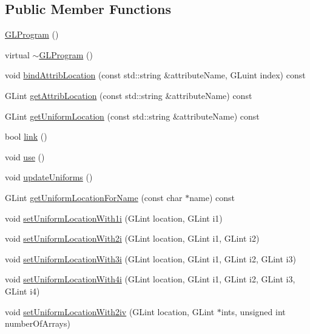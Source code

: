 \subsection*{Public Member Functions}
\begin{DoxyCompactItemize}
\item 
\hyperlink{classGLProgram_ac6a2778c8bf8c49e0d8ceb6d88e1a8fe}{G\+L\+Program} ()
\item 
virtual \hyperlink{classGLProgram_afbda874ed54a3f71625556083eba8603}{$\sim$\+G\+L\+Program} ()
\item 
void \hyperlink{classGLProgram_a06fab65fe4aa591530f2b5e61516756c}{bind\+Attrib\+Location} (const std\+::string \&attribute\+Name, G\+Luint index) const
\item 
G\+Lint \hyperlink{classGLProgram_a2bdaba0068ae955ee8395f6017f7781b}{get\+Attrib\+Location} (const std\+::string \&attribute\+Name) const
\item 
G\+Lint \hyperlink{classGLProgram_a36c4bb72ceff2951794c8b0b52ed9ef1}{get\+Uniform\+Location} (const std\+::string \&attribute\+Name) const
\item 
bool \hyperlink{classGLProgram_a667d81ca9b3ac97fb8959aacdcb96f0b}{link} ()
\item 
void \hyperlink{classGLProgram_a02d4c488d50f8e4235e6476d111b0890}{use} ()
\item 
void \hyperlink{classGLProgram_a4c3fb8cdcfbdcd1e88c9b1b768ad64e9}{update\+Uniforms} ()
\item 
G\+Lint \hyperlink{classGLProgram_a096688ee4d0f1628f228325e1c64176c}{get\+Uniform\+Location\+For\+Name} (const char $\ast$name) const
\item 
void \hyperlink{classGLProgram_afa360f891bfeb78a7c243b79ae549325}{set\+Uniform\+Location\+With1i} (G\+Lint location, G\+Lint i1)
\item 
void \hyperlink{classGLProgram_abefc77093c5e21dfdf7e0c71bed024c6}{set\+Uniform\+Location\+With2i} (G\+Lint location, G\+Lint i1, G\+Lint i2)
\item 
void \hyperlink{classGLProgram_a7488acc88c3b6376c714d6b9cd242f31}{set\+Uniform\+Location\+With3i} (G\+Lint location, G\+Lint i1, G\+Lint i2, G\+Lint i3)
\item 
void \hyperlink{classGLProgram_ab0763aef27f2734758ea139dbfe9e139}{set\+Uniform\+Location\+With4i} (G\+Lint location, G\+Lint i1, G\+Lint i2, G\+Lint i3, G\+Lint i4)
\item 
void \hyperlink{classGLProgram_ae367303d8a685968a2c94ddc26ca2136}{set\+Uniform\+Location\+With2iv} (G\+Lint location, G\+Lint $\ast$ints, unsigned int number\+Of\+Arrays)

\end{DoxyCompactItemize}
